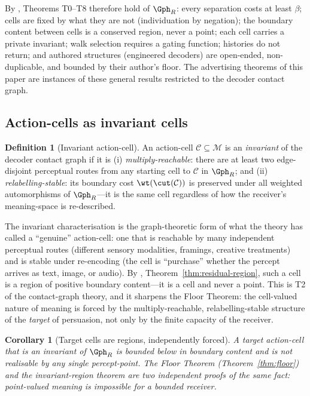 \documentclass[twocolumn,11pt,a4paper]{article}
\theoremstyle{adv}
\newtheorem{corollary}[theorem]{Corollary}
\theoremstyle{definition}
\newtheorem{definition}[theorem]{Definition}
\theoremstyle{remark}
\newcommand{\Cell}{\mathcal{C}}        %
\newcommand{\Recv}{R}                  %
\newcommand{\floor}{\beta}            %
\newcommand{\Mean}{\mathcal{M}}        %
\begin{document}
By \citet{sachikonye2025contact}, Theorems T0--T8 therefore hold of $\Gph_\Recv$:
every separation costs at least $\floor$; cells are fixed by what they are not
(individuation by negation); the boundary content between cells is a conserved
region, never a point; each cell carries a private invariant; walk selection
requires a gating function; histories do not return; and authored structures
(engineered decoders) are open-ended, non-duplicable, and bounded by their
author's floor. The advertising theorems of this paper are instances of these
general results restricted to the decoder contact graph.

\subsection{Action-cells as invariant cells}

\begin{definition}[Invariant action-cell]
\label{def:invariant-cell}
An action-cell $\Cell\subseteq\Mean$ is an \emph{invariant} of the decoder
contact graph if it is (i) \emph{multiply-reachable}: there are at least two
edge-disjoint perceptual routes from any starting cell to $\Cell$ in
$\Gph_\Recv$; and (ii) \emph{relabelling-stable}: its boundary cost
$\wt(\cut(\Cell))$ is preserved under all weighted automorphisms of
$\Gph_\Recv$---it is the same cell regardless of how the receiver's meaning-space
is re-described.
\end{definition}

The invariant characterisation is the graph-theoretic form of what the theory
has called a ``genuine'' action-cell: one that is reachable by many independent
perceptual routes (different sensory modalities, framings, creative treatments)
and is stable under re-encoding (the cell is ``purchase'' whether the percept
arrives as text, image, or audio). By \citet{sachikonye2025contact},
Theorem~\ref{thm:residual-region}, such a cell is a region of positive boundary
content---it is a cell and never a point. This is T2 of the contact-graph
theory, and it sharpens the Floor Theorem: the cell-valued nature of meaning is
forced by the multiply-reachable, relabelling-stable structure of the
\emph{target} of persuasion, not only by the finite capacity of the receiver.

\begin{corollary}[Target cells are regions, independently forced]
\label{cor:target-region}
A target action-cell that is an invariant of $\Gph_\Recv$ is bounded below in
boundary content and is not realisable by any single percept-point. The Floor
Theorem (Theorem~\ref{thm:floor}) and the invariant-region theorem
\citep[T2]{sachikonye2025contact} are two independent proofs of the same fact:
point-valued meaning is impossible for a bounded receiver.
\end{corollary}
\end{document}
